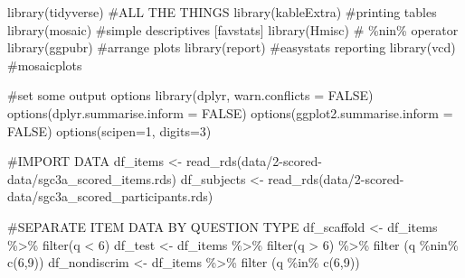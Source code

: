 \documentclass[
  letterpaper,
  DIV=11,
  numbers=noendperiod]{scrreprt}
\newenvironment{Shaded}{\begin{snugshade}}{\end{snugshade}}
\newcommand{\AttributeTok}[1]{\textcolor[rgb]{0.40,0.45,0.13}{#1}}
\newcommand{\CommentTok}[1]{\textcolor[rgb]{0.37,0.37,0.37}{#1}}
\newcommand{\ConstantTok}[1]{\textcolor[rgb]{0.56,0.35,0.01}{#1}}
\newcommand{\DecValTok}[1]{\textcolor[rgb]{0.68,0.00,0.00}{#1}}
\newcommand{\FunctionTok}[1]{\textcolor[rgb]{0.28,0.35,0.67}{#1}}
\newcommand{\NormalTok}[1]{\textcolor[rgb]{0.00,0.23,0.31}{#1}}
\newcommand{\OtherTok}[1]{\textcolor[rgb]{0.00,0.23,0.31}{#1}}
\newcommand{\SpecialCharTok}[1]{\textcolor[rgb]{0.37,0.37,0.37}{#1}}
\newcommand{\StringTok}[1]{\textcolor[rgb]{0.13,0.47,0.30}{#1}}
\begin{document}
\begin{Shaded}
\begin{Highlighting}[]
\FunctionTok{library}\NormalTok{(tidyverse) }\CommentTok{\#ALL THE THINGS}
\FunctionTok{library}\NormalTok{(kableExtra) }\CommentTok{\#printing tables }
\FunctionTok{library}\NormalTok{(mosaic) }\CommentTok{\#simple descriptives [favstats]}
\FunctionTok{library}\NormalTok{(Hmisc) }\CommentTok{\# \%nin\% operator}
\FunctionTok{library}\NormalTok{(ggpubr) }\CommentTok{\#arrange plots}
\FunctionTok{library}\NormalTok{(report) }\CommentTok{\#easystats reporting}
\FunctionTok{library}\NormalTok{(vcd) }\CommentTok{\#mosaicplots}

\CommentTok{\#set some output options}
\FunctionTok{library}\NormalTok{(dplyr, }\AttributeTok{warn.conflicts =} \ConstantTok{FALSE}\NormalTok{)}
\FunctionTok{options}\NormalTok{(}\AttributeTok{dplyr.summarise.inform =} \ConstantTok{FALSE}\NormalTok{)}
\FunctionTok{options}\NormalTok{(}\AttributeTok{ggplot2.summarise.inform =} \ConstantTok{FALSE}\NormalTok{)}
\FunctionTok{options}\NormalTok{(}\AttributeTok{scipen=}\DecValTok{1}\NormalTok{, }\AttributeTok{digits=}\DecValTok{3}\NormalTok{)}

\CommentTok{\#IMPORT DATA }
\NormalTok{df\_items }\OtherTok{\textless{}{-}} \FunctionTok{read\_rds}\NormalTok{(}\StringTok{\textquotesingle{}data/2{-}scored{-}data/sgc3a\_scored\_items.rds\textquotesingle{}}\NormalTok{)}
\NormalTok{df\_subjects }\OtherTok{\textless{}{-}} \FunctionTok{read\_rds}\NormalTok{(}\StringTok{\textquotesingle{}data/2{-}scored{-}data/sgc3a\_scored\_participants.rds\textquotesingle{}}\NormalTok{)}


\CommentTok{\#SEPARATE ITEM DATA BY QUESTION TYPE}
\NormalTok{df\_scaffold }\OtherTok{\textless{}{-}}\NormalTok{ df\_items }\SpecialCharTok{\%\textgreater{}\%} \FunctionTok{filter}\NormalTok{(q }\SpecialCharTok{\textless{}} \DecValTok{6}\NormalTok{)}
\NormalTok{df\_test }\OtherTok{\textless{}{-}}\NormalTok{ df\_items }\SpecialCharTok{\%\textgreater{}\%} \FunctionTok{filter}\NormalTok{(q }\SpecialCharTok{\textgreater{}} \DecValTok{6}\NormalTok{) }\SpecialCharTok{\%\textgreater{}\%} \FunctionTok{filter}\NormalTok{ (q }\SpecialCharTok{\%nin\%} \FunctionTok{c}\NormalTok{(}\DecValTok{6}\NormalTok{,}\DecValTok{9}\NormalTok{))}
\NormalTok{df\_nondiscrim }\OtherTok{\textless{}{-}}\NormalTok{ df\_items }\SpecialCharTok{\%\textgreater{}\%} \FunctionTok{filter}\NormalTok{ (q }\SpecialCharTok{\%in\%} \FunctionTok{c}\NormalTok{(}\DecValTok{6}\NormalTok{,}\DecValTok{9}\NormalTok{))}
\end{Highlighting}
\end{Shaded}
\end{document}
